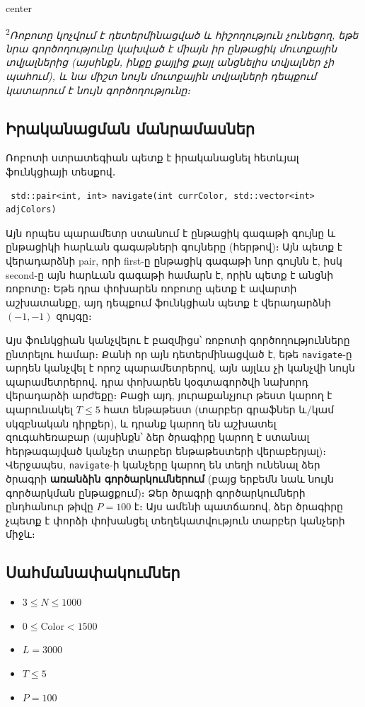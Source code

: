 \documentclass[12pt]{article}
\begin{document}
\begin{adjustbox}{center}
	
\end{adjustbox}

\textsuperscript{2}\textit{Ռոբոտը կոչվում է դետերմինացված և հիշողություն չունեցող, եթե նրա գործողությունը կախված է միայն իր ընթացիկ մուտքային տվյալներից (այսինքն, ինքը քայլից քայլ անցնելիս տվյալներ չի պահում), և նա միշտ նույն մուտքային տվյալների դեպքում կատարում է նույն գործողությունը։}

\subsection{Իրականացման մանրամասներ}
Ռոբոտի ստրատեգիան պետք է իրականացնել հետևյալ ֆունկցիայի տեսքով․
\begin{lstlisting}
 std::pair<int, int> navigate(int currColor, std::vector<int> adjColors)
\end{lstlisting}

Այն որպես պարամետր ստանում է ընթացիկ գագաթի գույնը և ընթացիկի հարևան գագաթների գույները (հերթով)։ Այն պետք է վերադարձնի  pair, որի first-ը ընթացիկ գագաթի նոր գույնն է, իսկ second-ը այն հարևան գագաթի համարն է, որին պետք է անցնի ռոբոտը։ Եթե դրա փոխարեն ռոբոտը պետք է ավարտի աշխատանքը, այդ դեպքում ֆունկցիան պետք է վերադարձնի $(-1, -1)$ զույգը։

Այս ֆունկցիան կանչվելու է բազմիցս՝ ռոբոտի գործողությունները ընտրելու համար։ Քանի որ այն դետերմինացված է, եթե \texttt{navigate}-ը արդեն կանչվել է որոշ պարամետրերով, այն այլևս չի կանչվի նույն պարամետրերով․ դրա փոխարեն կօգտագործվի նախորդ վերադարձի արժեքը։ Բացի այդ, յուրաքանչյուր թեստ կարող է պարունակել $T \leq 5$ հատ ենթաթեստ (տարբեր գրաֆներ և/կամ սկզբնական դիրքեր), և դրանք կարող են աշխատել զուգահեռաբար (այսինքն՝ ձեր ծրագիրը կարող է ստանալ հերթագայված կանչեր տարբեր ենթաթեստերի վերաբերյալ)։ Վերջապես, \texttt{navigate}-ի կանչերը կարող են տեղի ունենալ ձեր ծրագրի \textbf{առանձին գործարկումներում} (բայց երբեմն նաև նույն գործարկման ընթացքում)։ Ձեր ծրագրի գործարկումների ընդհանուր թիվը $P = 100$ է։ Այս ամենի պատճառով, ձեր ծրագիրը չպետք է փորձի փոխանցել տեղեկատվություն տարբեր կանչերի միջև։

\subsection{Սահմանափակումներ}

\begin{itemize}
\item $3 \leq N \leq 1000$
\item $0 \leq \mathrm{Color} < 1500$
\item $L = 3000$
\item $T \leq 5$
\item $P = 100$
\end{itemize}
\end{document}
